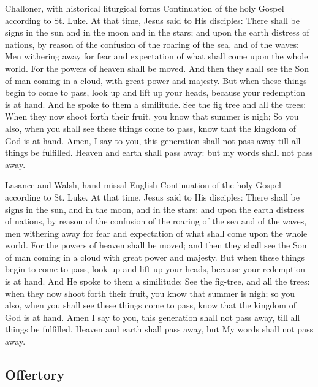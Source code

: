 \begin{englishwitness}{Challoner, with historical liturgical forms}
Continuation of the holy Gospel according to St. Luke. At that time, Jesus said to His disciples: There shall be signs in the sun and in the moon and in the stars; and upon the earth distress of nations, by reason of the confusion of the roaring of the sea, and of the waves: Men withering away for fear and expectation of what shall come upon the whole world. For the powers of heaven shall be moved. And then they shall see the Son of man coming in a cloud, with great power and majesty. But when these things begin to come to pass, look up and lift up your heads, because your redemption is at hand. And he spoke to them a similitude. See the fig tree and all the trees: When they now shoot forth their fruit, you know that summer is nigh; So you also, when you shall see these things come to pass, know that the kingdom of God is at hand. Amen, I say to you, this generation shall not pass away till all things be fulfilled. Heaven and earth shall pass away: but my words shall not pass away.
\end{englishwitness}

\begin{englishwitness}{Lasance and Walsh, hand-missal English}
Continuation of the holy Gospel according to St. Luke. At that time, Jesus said to His disciples: There shall be signs in the sun, and in the moon, and in the stars: and upon the earth distress of nations, by reason of the confusion of the roaring of the sea and of the waves, men withering away for fear and expectation of what shall come upon the whole world. For the powers of heaven shall be moved; and then they shall see the Son of man coming in a cloud with great power and majesty. But when these things begin to come to pass, look up and lift up your heads, because your redemption is at hand. And He spoke to them a similitude: See the fig-tree, and all the trees: when they now shoot forth their fruit, you know that summer is nigh; so you also, when you shall see these things come to pass, know that the kingdom of God is at hand. Amen I say to you, this generation shall not pass away, till all things be fulfilled. Heaven and earth shall pass away, but My words shall not pass away.
\end{englishwitness}

\subsection{Offertory}
\label{proper-offertory}


